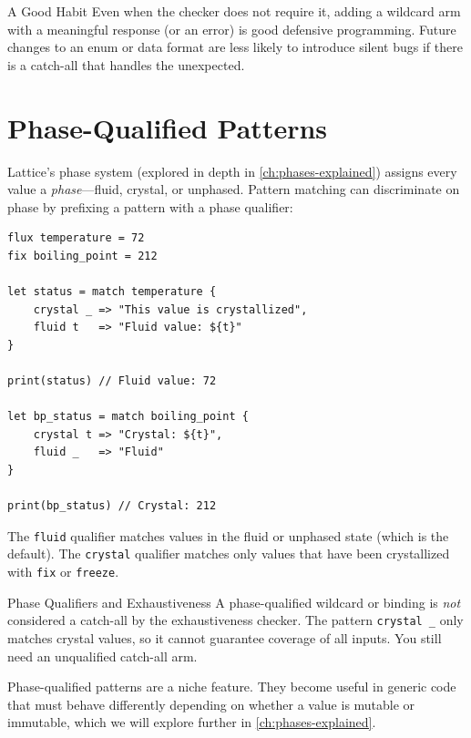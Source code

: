 \begin{tipbox}{A Good Habit}
Even when the checker does not require it, adding a wildcard arm with a meaningful response (or an error) is good defensive programming. Future changes to an enum or data format are less likely to introduce silent bugs if there is a catch-all that handles the unexpected.
\end{tipbox}

\section{Phase-Qualified Patterns}\label{sec:phase-patterns}

Lattice's phase system (explored in depth in \cref{ch:phases-explained}) assigns every value a \emph{phase}---fluid, crystal, or unphased. Pattern matching can discriminate on phase by prefixing a pattern with a phase qualifier:

\begin{lstlisting}[language=Lattice, caption={Phase-qualified patterns}]
flux temperature = 72
fix boiling_point = 212

let status = match temperature {
    crystal _ => "This value is crystallized",
    fluid t   => "Fluid value: ${t}"
}

print(status) // Fluid value: 72

let bp_status = match boiling_point {
    crystal t => "Crystal: ${t}",
    fluid _   => "Fluid"
}

print(bp_status) // Crystal: 212
\end{lstlisting}

The \lstinline|fluid| qualifier matches values in the fluid or unphased state (which is the default). The \lstinline|crystal| qualifier matches only values that have been crystallized with \lstinline|fix| or \lstinline|freeze|.

\begin{warnbox}{Phase Qualifiers and Exhaustiveness}
A phase-qualified wildcard or binding is \emph{not} considered a catch-all by the exhaustiveness checker. The pattern \lstinline|crystal _| only matches crystal values, so it cannot guarantee coverage of all inputs. You still need an unqualified catch-all arm.
\end{warnbox}

Phase-qualified patterns are a niche feature. They become useful in generic code that must behave differently depending on whether a value is mutable or immutable, which we will explore further in \cref{ch:phases-explained}.

